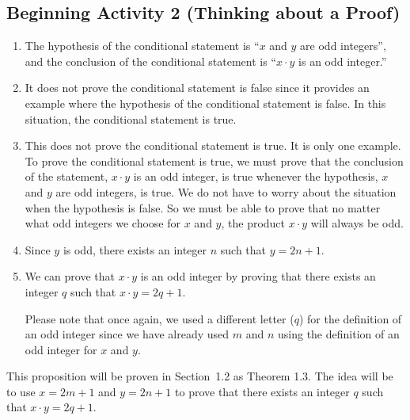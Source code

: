 \documentclass[11pt]{article}
\begin{document}
\subsection*{Beginning Activity 2 (Thinking about a Proof)}
\begin{enumerate}
\item The hypothesis of the conditional statement is ``$x$  and  $y$  are odd integers'', and the conclusion of the conditional statement is ``$x \cdot y$ is an odd integer.''

\item It does not prove the conditional statement is false since it provides an example where the hypothesis of the conditional statement is false.  In this situation, the conditional statement is true.

\item This does not prove the conditional statement is true.  It is only one example.  To prove the conditional statement is true, we must prove that the conclusion of the statement, $x \cdot y$ is an odd integer, is true whenever the hypothesis, $x$  and  $y$  are odd integers,  is true.  We do not have to worry about the situation when the hypothesis is false.  So we must be able to prove that no matter what odd integers we choose for  $x$  and  $y$, the product  
$x \cdot y$  will always be odd.

\item Since $y$ is odd, there exists an integer $n$ such that $y = 2n + 1$.

\item We can prove that $x \cdot y$ is an odd integer by proving that there exists an integer $q$ such that 
$x \cdot y = 2q + 1$.

Please note that once again, we used a different letter ($q$) for the definition of an odd integer since we have already used $m$ and $n$ using the definition of an odd integer for $x$ and $y$.

%
%
%
\end{enumerate}
This proposition will be proven in Section~1.2 as Theorem 1.3.  The idea will be to use $x = 2m + 1$ and $y = 2n + 1$ to prove that there exists an integer $q$ such that 
$x\cdot y = 2q + 1$.  
\hbreak
\end{document}
